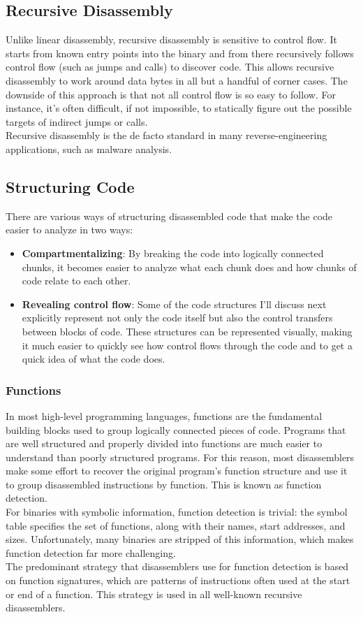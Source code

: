 \subsection{Recursive Disassembly}
Unlike linear disassembly, recursive disassembly is sensitive to control flow. It starts from known entry points into the binary and from there recursively follows control flow (such as jumps and calls) to discover code.  This allows recursive disassembly to work around data bytes in all but a handful of corner cases. The downside of this approach is that not all control flow is so easy to follow. For instance, it’s often difficult, if not impossible, to statically figure out the possible targets of indirect jumps or calls. \\
Recursive disassembly is the de facto standard in many reverse-engineering applications, such as malware analysis.

\subsection{Structuring Code}
There are various ways of structuring disassembled code that make the code easier to analyze in two ways:

\begin{itemize}
    \item \textbf{Compartmentalizing}: By breaking the code into logically connected chunks, it becomes easier to analyze what each chunk does and how chunks of code relate to each other.
    \item \textbf{Revealing control flow}: Some of the code structures I’ll discuss next explicitly represent not only the code itself but also the control transfers between blocks of code. These structures can be represented visually, making it much easier to quickly see how control flows through the code and to get a quick idea of what the code does.
\end{itemize}

\subsubsection{Functions}
In most high-level programming languages, functions are the fundamental building blocks used to group logically connected pieces of code. Programs that are well structured and properly divided into functions are much easier to understand than poorly structured programs. For this reason, most disassemblers make some effort to recover the original program’s function structure and use it to group disassembled instructions by function. This is known as function detection. \\
For binaries with symbolic information, function detection is trivial: the symbol table specifies the set of functions, along with their names, start addresses, and sizes. Unfortunately, many binaries are stripped of this information, which makes function detection far more challenging. \\
The predominant strategy that disassemblers use for function detection is based on function signatures, which are patterns of instructions often used at the start or end of a function. This strategy is used in all well-known recursive disassemblers.

